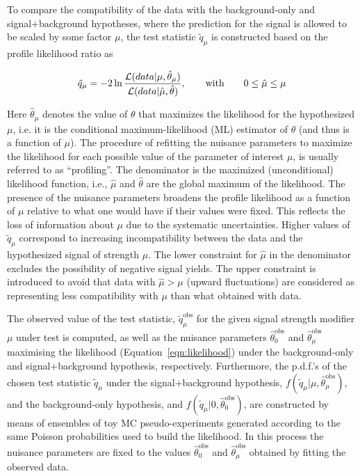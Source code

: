 To compare the compatibility of the data with the background-only and signal+background hypotheses, where the prediction for the signal is allowed to be scaled by some factor $\mu$,
the test statistic $\tilde{q}_\mu$ is constructed based on the profile likelihood ratio as

\begin{equation}\label{eqn:testStatistic}
\tilde{q}_\mu = -2\ln\frac{{\cal L}(data | \mu,\hat{\theta}_\mu)}{{\cal L}( data | \hat{\mu},\hat{\theta})},\qquad \mathrm{with} \qquad 0 \leq \hat{\mu} \leq \mu
\end{equation}

Here $\hat{\theta}_\mu$ denotes the value of $\theta$ that maximizes the likelihood for the hypothesized $\mu$,
i.e. it is the conditional maximum-likelihood (ML) estimator of $\theta$ (and thus is a function of $\mu$). 
The procedure of refitting the nuisance parameters to maximize the likelihood for each possible value of the parameter of interest $\mu$, is usually referred to as ``profiling''.
The denominator is the maximized (unconditional) likelihood function, i.e., $\hat{\mu}$ and $\hat{\theta}$ are the global maximum of the likelihood.
The presence of the nuisance parameters broadens the profile likelihood as a function of $\mu$ relative to what one would have if their values were fixed.
This reflects the loss of information about $\mu$ due to the systematic uncertainties.
Higher values of $\tilde{q}_\mu$ correspond to increasing incompatibility between the data and the hypothesized signal of strength $\mu$.
The lower constraint for $\hat{\mu}$ in the denominator excludes the possibility of negative signal yields. 
The upper constraint is introduced to avoid that data with $\hat{\mu} > \mu$ (upward fluctuations) are considered as representing less compatibility with $\mu$ than what obtained with data.

The observed value of the test statistic, $\tilde{q}_\mu^\mathrm{obs}$ for the given signal strength modifier $\mu$ under test is computed,
as well as the nuisance parameters $\hat{\theta}_0^\mathrm{obs}$ and $\hat{\theta}_\mu^\mathrm{obs}$ maximising the likelihood (Equation~\ref{eqn:likelihood}) under the background-only and signal+background hypothesis, respectively.
Furthermore, the p.d.f.'s of the chosen test statistic $\tilde{q}_\mu$ under the signal+background hypothesis, $f(\tilde{q}_\mu|\mu,\hat{\theta}_\mu^\mathrm{obs})$,
and the background-only hypothesis, and $f(\tilde{q}_\mu|0,\hat{\theta}_0^\mathrm{obs})$, are constructed by means of ensembles of toy MC pseudo-experiments
generated according to the same Poisson probabilities used to build the likelihood. In this process the nuisance parameters 
are fixed to the values $\hat{\theta}_0^\mathrm{obs}$ and $\hat{\theta}_\mu^\mathrm{obs}$ obtained by fitting the observed data.

